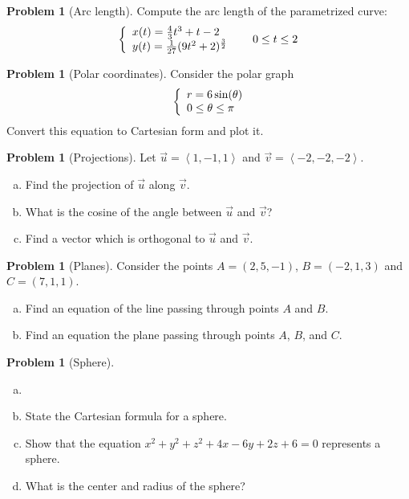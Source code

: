 \documentclass[10pt]{article}
\theoremstyle{definition}
\newtheorem{problem}[theorem]{Problem}
\newcommand{\1}[1]{\textbf{1}_{\left[#1\right]}} %
\begin{document}
\begin{problem}[Arc length]
  Compute the arc length of the parametrized curve:
  \begin{equation*}
    \left\{ \begin{array}{l@{}l} x(t) = \frac{4}{3}t^{3}+t-2 \\ y(t) = \frac{1}{27}(9t^{2}+2)^{\frac{3}{2}} \end{array}\right. \qquad 0 \leq t \leq 2
  \end{equation*}
\end{problem}


\begin{problem}[Polar coordinates]
  Consider the polar graph
  \begin{equation*}
    \left\{ \begin{array}{l@{}l} r= 6\sin(\theta) \\ 0 \leq  \theta \leq \pi \end{array}\right.  %
  \end{equation*}
  Convert this equation to Cartesian form and plot it.
\end{problem}

\begin{problem}[Projections]
  Let $\vec{u}= \left\langle 1,-1,1 \right\rangle $ and $\vec{v} = \left\langle -2,-2,-2 \right\rangle $.
  \begin{enumerate}[(a)]
    \item Find the projection of $\vec{u}$ along $\vec{v}$. 
    \item What is the cosine of the angle between $\vec{u}$ and $\vec{v}$?
    \item Find a vector which is orthogonal to $\vec{u}$ and $\vec{v}$.
  \end{enumerate}
\end{problem}

\begin{problem}[Planes]
  Consider the points  $A=(2,5,-1)$, $B=(-2,1,3)$ and $C = (7,1,1)$.
  \begin{enumerate}[(a)]
    \item Find an equation of the line passing through points $A$ and $B$.
    \item Find an equation the plane passing through points $A$, $B$, and $C$.
  \end{enumerate}
\end{problem}


\begin{problem}[Sphere]
  \begin{enumerate}[(a)]
    \item []
    \item State the Cartesian formula for a sphere.
    \item Show that the equation $x^{2}+y^{2}+z^{2} +4x - 6y + 2z +6=0 $ represents a sphere.
    \item What is the center and radius of the sphere?
  \end{enumerate}
\end{problem}
\end{document}
